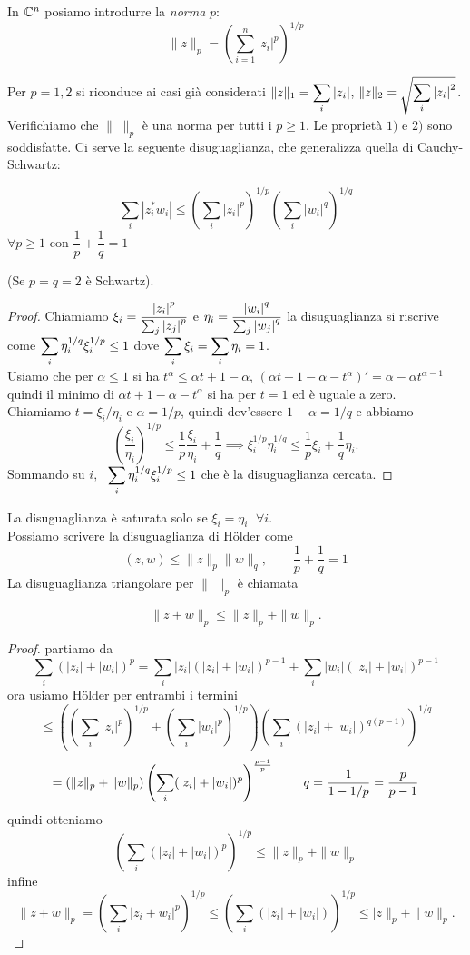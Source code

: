 \begin{definition}[norma $p$]
In $\mathbb C^n$ posiamo introdurre la \emph{norma} $p$:
\[
\|z\|_p=\left(\sum_{i=1}^n|z_i|^p\right)^{1/p}
\]
\end{definition}
Per $p=1, 2$ si riconduce ai casi già considerati 
$\displaystyle \|z\|_1 = \sum_i {\left|z_i\right|}$, $\displaystyle \|z\|_2 = \sqrt{ \sum_i {\left|z_i\right|}^2 }$.
Verifichiamo che $\| \; \|_p$ è una norma per tutti i $p \geq 1$.
Le proprietà $1)$ e $2)$ sono soddisfatte. Ci serve la seguente
disuguaglianza, che generalizza quella di Cauchy-Schwartz:
\begin{theorem}
\[
\sum_i|z_i^*w_i|\leq \left(\sum_i|z_i|^p\right)^{1/p}\left(\sum_i|w_i|^q\right)^{1/q}
\]
$\forall p \geq 1$ con $\dfrac{1}{p} + \dfrac{1}{q} = 1$
\end{theorem}
(Se $p = q = 2$ è Schwartz).
\begin{proof}
Chiamiamo
$\displaystyle \xi_i = \frac{{\left|z_i\right|}^p}{\sum_j {\left|z_j\right|}^p}$
e
$\displaystyle \eta_i = \frac{{\left|w_i\right|}^q}{\sum_j {\left|w_j\right|}^q}$
la disuguaglianza si riscrive come
$\displaystyle \sum_i \eta_i^{1/q} \xi_i^{1/p} \leq 1$ dove 
$\displaystyle \sum_i \xi_i = \sum_i \eta_i = 1$.\\
Usiamo che per $\alpha \leq 1$  si ha $t^\alpha \leq \alpha t + 1 - \alpha$,
$(\alpha t + 1 - \alpha - t^\alpha)' = \alpha - \alpha t^{\alpha-1}$
quindi il minimo di $\alpha t + 1 - \alpha - t^\alpha$ si ha
per $t=1$ ed è uguale a zero.\\
Chiamiamo $t = \xi_i/\eta_i$ e $\alpha = 1/p$, quindi dev'essere
$1 - \alpha = 1/q$ e abbiamo
\[
\left( \frac{\xi_i}{\eta_i} \right)^{1/p} \leq 
\frac{1}{p} \frac{\xi_i}{\eta_i} + \frac{1}{q} \implies
\xi_i^{1/p} \eta_i^{1/q} \leq \frac{1}{p} \xi_i + \frac{1}{q} \eta_i
.\]
Sommando su $i, \;$ $\displaystyle \sum_i \eta_i^{1/q} \xi_i^{1/p} \leq 1$
che è la disuguaglianza cercata.
\end{proof}
La disuguaglianza è saturata solo se $\xi_i = \eta_i \;$ $\forall i$. \\
Possiamo scrivere la disuguaglianza di H\"{o}lder come 
\[
(z, w) \leq \|z\|_p \|w\|_q, \qquad \frac{1}{p} + \frac{1}{q} = 1
\]
La disuguaglianza triangolare per $\| \; \|_p$ è chiamata
\begin{theorem}
\[
\|z+w\|_p\leq \|z\|_p+\|w\|_p
.\]
\end{theorem}
\begin{proof}
partiamo da
\[\sum_i(|z_i|+|w_i|)^p=\sum_i|z_i|(|z_i|+|w_i|)^{p-1}+\sum_i|w_i|(|z_i|+|w_i|)^{p-1}\]
ora usiamo H\"{o}lder per entrambi i termini
\[\leq\left(\left(\sum_i|z_i|^p\right)^{1/p}+\left(\sum_i|w_i|^p\right)^{1/p}\right)\left(\sum_i(|z_i|+|w_i|)^{q(p-1)}\right)^{1/q}\]
\[=(\|z\|_p+\|w\|_p)\left(\sum_i(|z_i|+|w_i|)^p\right)^{\frac{p-1}{p}}\hspace{8mm} q=\frac{1}{1-1/p}=\frac{p}{p-1}\]
quindi otteniamo
\[\left(\sum_i(|z_i|+|w_i|)^p\right)^{1/p}\leq \|z\|_p+\|w\|_p\]
infine
\[
\|z+w\|_p=\left(\sum_i|z_i+w_i|^p\right)^{1/p}\leq \left(\sum_i(|z_i|+|w_i|)\right)^{1/p}\leq |z\|_p+\|w\|_p
.\]
\end{proof}

